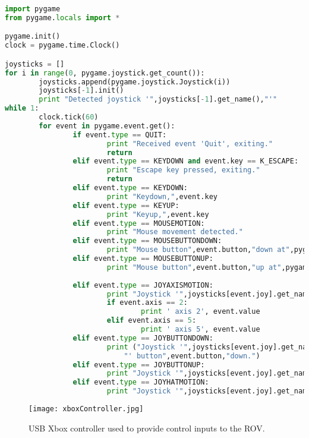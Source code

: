 \begin{lstlisting}[style=myPythonStyle,language=Python]
import pygame
from pygame.locals import *

pygame.init()
clock = pygame.time.Clock()

joysticks = []
for i in range(0, pygame.joystick.get_count()):
        joysticks.append(pygame.joystick.Joystick(i))
        joysticks[-1].init()
        print "Detected joystick '",joysticks[-1].get_name(),"'"
while 1:
        clock.tick(60)
        for event in pygame.event.get():
                if event.type == QUIT:
                        print "Received event 'Quit', exiting."
                        return
                elif event.type == KEYDOWN and event.key == K_ESCAPE:
                        print "Escape key pressed, exiting."
                        return
                elif event.type == KEYDOWN:
                        print "Keydown,",event.key
                elif event.type == KEYUP:
                        print "Keyup,",event.key
                elif event.type == MOUSEMOTION:
                        print "Mouse movement detected."
                elif event.type == MOUSEBUTTONDOWN:
                        print "Mouse button",event.button,"down at",pygame.mouse.get_pos()
                elif event.type == MOUSEBUTTONUP:
                        print "Mouse button",event.button,"up at",pygame.mouse.get_pos()
                        
                elif event.type == JOYAXISMOTION:
                        print "Joystick '",joysticks[event.joy].get_name(),"' axis",event.axis,"motion."
                        if event.axis == 2:
                                print ' axis 2', event.value
                        elif event.axis == 5:
                                print ' axis 5', event.value
                elif event.type == JOYBUTTONDOWN:
                        print ("Joystick '",joysticks[event.joy].get_name(),
                            "' button",event.button,"down.")
                elif event.type == JOYBUTTONUP:
                        print "Joystick '",joysticks[event.joy].get_name(),"' button",event.button,"up."
                elif event.type == JOYHATMOTION:
                        print "Joystick '",joysticks[event.joy].get_name(),"' hat",event.hat," moved to",event.value
\end{lstlisting}

\begin{figure}[]
\begin{center}
\texttt{[image: xboxController.jpg]}
\end{center}
\caption{USB Xbox controller used to provide control inputs to the ROV.}
\label{fig:xboxController}
\end{figure}


